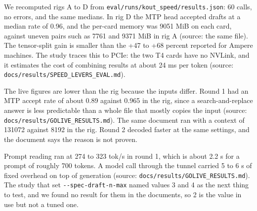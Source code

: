 We recomputed rigs A to D from \texttt{eval/\allowbreak{}runs/\allowbreak{}kout\_\allowbreak{}speed/\allowbreak{}results.\allowbreak{}json}: 60 calls, no errors, and the same medians. In rig D the MTP head accepted drafts at a median rate of 0.96, and the per-card memory was 9051 MiB on each card, against uneven pairs such as 7761 and 9371 MiB in rig A (source: the same file). The tensor-split gain is smaller than the +47 to +68 percent reported for Ampere machines. The study traces this to PCIe: the two T4 cards have no NVLink, and it estimates the cost of combining results at about 24 ms per token (source: \texttt{docs/\allowbreak{}results/\allowbreak{}SPEED\_\allowbreak{}LEVERS\_\allowbreak{}EVAL.\allowbreak{}md}).

The live figures are lower than the rig because the inputs differ. Round 1 had an MTP accept rate of about 0.89 against 0.965 in the rig, since a search-and-replace answer is less predictable than a whole file that mostly copies the input (source: \texttt{docs/\allowbreak{}results/\allowbreak{}GOLIVE\_\allowbreak{}RESULTS.\allowbreak{}md}). The same document ran with a context of 131072 against 8192 in the rig. Round 2 decoded faster at the same settings, and the document says the reason is not proven.

Prompt reading ran at 274 to 323 tok/\allowbreak{}s in round 1, which is about 2.2 s for a prompt of roughly 700 tokens. A model call through the tunnel carried 5 to 6 s of fixed overhead on top of generation (source: \texttt{docs/\allowbreak{}results/\allowbreak{}GOLIVE\_\allowbreak{}RESULTS.\allowbreak{}md}). The study that set \texttt{-\allowbreak{}-\allowbreak{}spec-\allowbreak{}draft-\allowbreak{}n-\allowbreak{}max} named values 3 and 4 as the next thing to test, and we found no result for them in the documents, so 2 is the value in use but not a tuned one.
